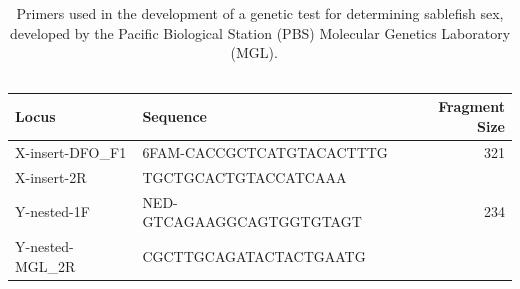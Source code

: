 \documentclass[12pt]{article}\usepackage[]{graphicx}\usepackage[]{color}
\begin{document}
\begin{table}[!h]

\caption{\label{tab:table2}Primers used in the development of a genetic test for determining sablefish sex, developed by the Pacific Biological Station (PBS) Molecular Genetics Laboratory (MGL). ~\\
\hspace*{0.333em}\\}
\fontsize{10}{12}\selectfont
\begin{tabular}[t]{llr}
\toprule
\textbf{Locus} & \textbf{Sequence} & \textbf{Fragment Size}\\
\midrule
X-insert-DFO\_F1 & 6FAM-CACCGCTCATGTACACTTTG & 321\\
X-insert-2R & TGCTGCACTGTACCATCAAA & \\
Y-nested-1F & NED-GTCAGAAGGCAGTGGTGTAGT & 234\\
Y-nested-MGL\_2R & CGCTTGCAGATACTACTGAATG & \\
\bottomrule
\end{tabular}
\end{table}
\clearpage
\end{document}
